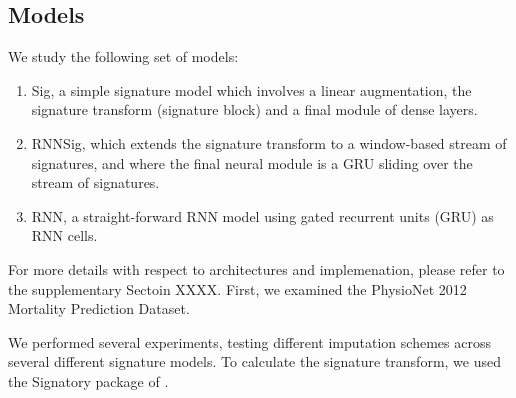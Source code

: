 \documentclass{article}
\begin{document}
\subsection{Models}
We study the following set of models:
\begin{enumerate}
    \item Sig, a simple signature model which involves a linear augmentation, the signature transform (signature block) and a final module of dense layers.
    \item RNNSig, which extends the signature transform to a window-based stream of signatures, and where the final neural module is a GRU sliding over the stream of signatures.
    \item RNN, a straight-forward RNN model using gated recurrent units (GRU) as RNN cells.
\end{enumerate}
For more details with respect to architectures and implemenation, please refer to the supplementary Sectoin XXXX.
First, we examined the PhysioNet 2012 Mortality Prediction Dataset.

We performed several experiments, testing different imputation schemes across several different signature models.
To calculate the signature transform, we used the Signatory package of \cite{signatory}.
\end{document}
